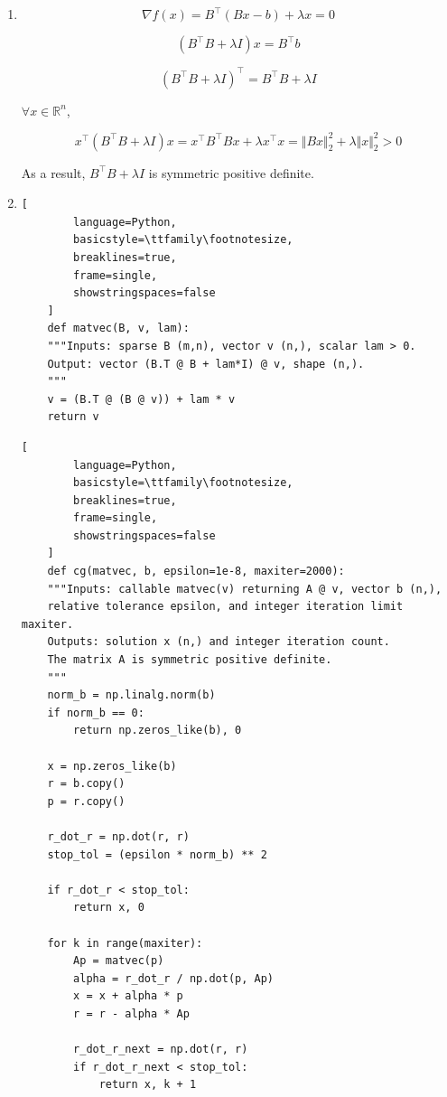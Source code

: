 \documentclass[11pt,a4paper]{article}
\begin{document}
\begin{enumerate}
    \item[1. ]
    
    $$
    \nabla f(x) = B^\top (Bx - b) + \lambda x = 0
    $$

    $$
    (B^\top B + \lambda I) x = B^\top b
    $$

    $$
    (B^\top B + \lambda I)^\top = B^\top B + \lambda I
    $$

    $\forall x \in \mathbb{R}^n$, 

    $$
    x^\top (B^\top B + \lambda I) x
    = x^\top B^\top B x + \lambda x^\top x
    = \Vert Bx \Vert _2^2 + \lambda \Vert x \Vert_2^2 > 0
    $$

    As a result, $B^\top B + \lambda I$ is symmetric positive definite.

    \item[2. ]
    
    \begin{lstlisting}[
        language=Python,
        basicstyle=\ttfamily\footnotesize,
        breaklines=true,
        frame=single,
        showstringspaces=false
    ]
    def matvec(B, v, lam):
    """Inputs: sparse B (m,n), vector v (n,), scalar lam > 0.
    Output: vector (B.T @ B + lam*I) @ v, shape (n,).
    """
    v = (B.T @ (B @ v)) + lam * v
    return v
    \end{lstlisting}

    \begin{lstlisting}[
        language=Python,
        basicstyle=\ttfamily\footnotesize,
        breaklines=true,
        frame=single,
        showstringspaces=false
    ]
    def cg(matvec, b, epsilon=1e-8, maxiter=2000):
    """Inputs: callable matvec(v) returning A @ v, vector b (n,),
    relative tolerance epsilon, and integer iteration limit maxiter.
    Outputs: solution x (n,) and integer iteration count.
    The matrix A is symmetric positive definite.
    """
    norm_b = np.linalg.norm(b)
    if norm_b == 0:
        return np.zeros_like(b), 0

    x = np.zeros_like(b)
    r = b.copy()
    p = r.copy()
    
    r_dot_r = np.dot(r, r)
    stop_tol = (epsilon * norm_b) ** 2

    if r_dot_r < stop_tol:
        return x, 0

    for k in range(maxiter):
        Ap = matvec(p)
        alpha = r_dot_r / np.dot(p, Ap)
        x = x + alpha * p
        r = r - alpha * Ap

        r_dot_r_next = np.dot(r, r)
        if r_dot_r_next < stop_tol:
            return x, k + 1


\end{lstlisting}
\end{enumerate}
\end{document}
